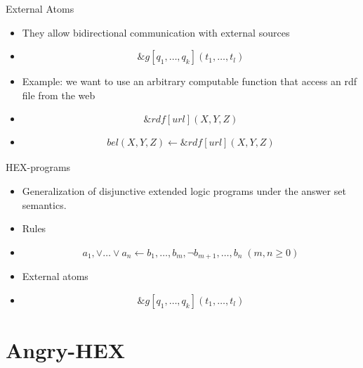 \documentclass[smaller, dvipsnames]{beamer}
\newcommand{\ah}{Angry-HEX\xspace}
\begin{document}
\begin{frame}{External Atoms}
    \begin{itemize}
    	\item<1-> They allow bidirectional communication with external sources
    	\item<2->[] \[ \&g[q_1,\dots,q_k](t_1,\dots,t_l) \]
    	\item<3-> Example: we want to use an arbitrary computable function that access an rdf file from the web
    	\item<4->[] \[ \&rdf[url](X,Y,Z) \]
    	\item<5->[] 
    		\begin{align*}
				bel(X,Y,Z) \leftarrow \&rdf[url](X,Y,Z)
    		\end{align*}
    \end{itemize}
\end{frame}

\begin{frame}{HEX-programs}
    \begin{itemize}
    	\item<1-> Generalization of disjunctive extended logic programs under the answer set semantics.
    	\item<2-> Rules
    	\item<2->[] \[ a_1, \lor \dots \lor a_n \leftarrow b_1, \dots , b_m, \neg b_{m+1}, \dots, b_n \; (m,n \geq 0)\]
    	\item<3-> External atoms
    	\item<3->[] \[ \&g[q_1,\dots,q_k](t_1,\dots,t_l) \]
    \end{itemize}
\end{frame}

\section{\ah}
\end{document}
